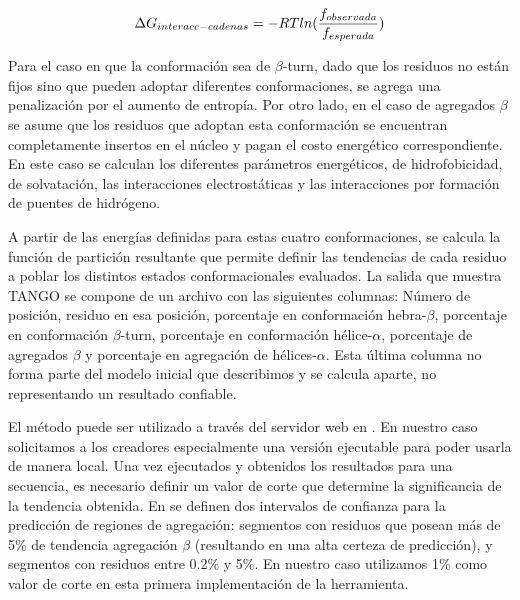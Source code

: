 \begin{equation}
\large
 \Delta G_{interacc-cadenas}=-RTln(\frac{f_{observada}}{f_{esperada}})
\end{equation}


Para el caso en que la conformación sea de $\beta$-turn, dado que los residuos no están fijos sino que pueden adoptar diferentes conformaciones, se agrega una penalización por el aumento de entropía.
Por otro lado, en el caso de agregados $\beta$ se asume que los residuos que adoptan esta conformación se encuentran completamente insertos en el núcleo y pagan el costo energético correspondiente. 
En este caso se calculan los diferentes parámetros energéticos, de hidrofobicidad, de solvatación, las interacciones electrostáticas y las interacciones por formación de puentes de hidrógeno.

A partir de las energías definidas para estas cuatro conformaciones, se calcula la función de partición resultante que permite definir las tendencias de cada residuo a poblar los distintos estados conformacionales evaluados.
La salida que muestra TANGO se compone de un archivo con las siguientes columnas:
Número de posición, residuo en esa posición, porcentaje en conformación hebra-$\beta$, porcentaje en conformación $\beta$-turn, porcentaje en conformación hélice-$\alpha$, porcentaje de agregados $\beta$ y
porcentaje en agregación de hélices-$\alpha$.
Esta última columna no forma parte del modelo inicial que describimos y se calcula aparte, no representando un resultado confiable.

El método puede ser utilizado a través del servidor web en \cite{tangoWeb}. En nuestro caso solicitamos a los creadores especialmente una versión ejecutable para poder usarla de manera local.
Una vez ejecutados y obtenidos los resultados para una secuencia, es necesario definir un valor de corte que determine la significancia de la tendencia obtenida.
En \cite{fernandez2004prediction} se definen dos intervalos de confianza para la predicción de regiones de agregación: segmentos con residuos que posean más de 5\% de tendencia agregación $\beta$ (resultando en una alta certeza de predicción),
y segmentos con residuos entre 0.2\% y 5\%. En nuestro caso utilizamos 1\% como valor de corte en esta primera implementación de la herramienta.


